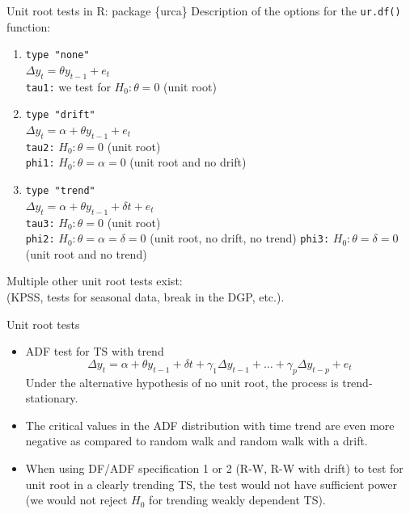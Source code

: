 \documentclass{beamer}
\begin{document}
\begin{frame}{Unit root tests in R: package \{urca\}}
Description of the options for the \texttt{ur.df()} function:
\medskip
\begin{enumerate}
\item \texttt{type "none"} \\
$\Delta y_t = \theta y_{t-1} + e_t$ ~\\
\texttt{tau1:} we test for $H_0: \theta = 0$ (unit root) 
\medskip
\item \texttt{type "drift"} \\
$\Delta y_t = \alpha + \theta y_{t-1} + e_t$ ~\\
\texttt{tau2:} $H_0: \theta = 0$ (unit root) \\
\texttt{phi1:} $H_0: \theta = \alpha = 0$ (unit root and no drift) 
\medskip
\item \texttt{type "trend"} \\
$\Delta y_t = \alpha + \theta y_{t-1} + \delta t + e_t$ ~\\
\texttt{tau3:} $H_0: \theta = 0$ (unit root) \\
\texttt{phi2:} $H_0: \theta = \alpha = \delta = 0$ (unit root, no drift, no trend) 
\texttt{phi3:} $H_0: \theta = \delta = 0$ (unit root and no trend) 
\end{enumerate}
Multiple other unit root tests exist: \\(KPSS, tests for seasonal data, break in the DGP, etc.).
\end{frame}
\begin{frame}{Unit root tests}
\begin{itemize}
\item ADF test for TS with trend
$$ \Delta y_t = \alpha  + \theta y_{t-1} + \delta t + \gamma_1\Delta y_{t-1}+\dots+\gamma_p\Delta y_{t-p}+e_t$$
Under the alternative hypothesis of no unit root, the process is trend-stationary.
\medskip
\item The critical values in the ADF distribution with time trend are even more negative as compared to random walk and random walk with a drift.
\medskip
\item When using DF/ADF specification 1 or 2 (R-W, R-W with drift) to test for unit root in a clearly trending TS, the test would not have sufficient power (we would not reject $H_0$ for trending weakly dependent TS).
\end{itemize}
\end{frame}
\end{document}
